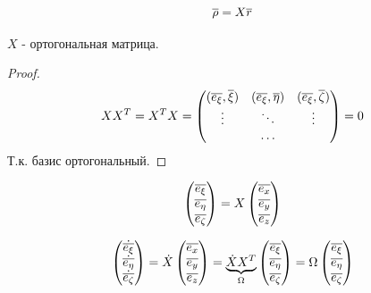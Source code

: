   $$ {\overline{\rho}} = X {\overline{r}} $$
  
  \begin{ass}
  $X$ - ортогональная матрица.
  \end{ass}
  \begin{proof}
  $$ XX^T = X^TX = 
  \left(
  \begin{matrix}
  ({\overline{e_{\xi}}}, {\overline{\xi}}) & 
  ({\overline{e_{\xi}}}, {\overline{\eta}}) & 
  ({\overline{e_{\xi}}}, {\overline{\zeta}}) \\
  \vdots & \ddots & \vdots \\
   & \ldots &
  \end{matrix} 
  \right)
  = 0 $$
  Т.к. базис ортогональный.
  \end{proof} 
  
  $$
  \left(
  \begin{matrix}
  {\overline{e_{\xi}}} \\
  {\overline{e_{\eta}}} \\
  {\overline{e_{\zeta}}} \\
  \end{matrix}
  \right)  
  =  
  X
  \left(
  \begin{matrix}
  {\overline{e_{x}}} \\
  {\overline{e_{y}}} \\
  {\overline{e_{z}}} \\
  \end{matrix}
  \right)
  $$

  $$
  \left(
  \begin{matrix}
  \dot{{\overline{e_{\xi}}}} \\
  \dot{{\overline{e_{\eta}}}} \\
  \dot{{\overline{e_{\zeta}}}} \\  
  \end{matrix}
  \right)
  = 
  \dot{X}
  \left(
  \begin{matrix}
  {\overline{e_{x}}} \\
  {\overline{e_{y}}} \\
  {\overline{e_{z}}} \\
  \end{matrix}
  \right) =
  \underbrace{
  \dot{X} X^T
  }_{\Omega}
  \left(
  \begin{matrix}
  {\overline{e_{\xi}}} \\
  {\overline{e_{\eta}}} \\
  {\overline{e_{\zeta}}} \\
  \end{matrix}
  \right)
  =
  \Omega
  \left(
  \begin{matrix}
  {\overline{e_{\xi}}} \\
  {\overline{e_{\eta}}} \\
  {\overline{e_{\zeta}}} \\
  \end{matrix}
  \right) 
  $$

